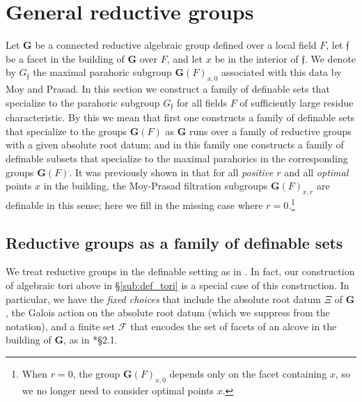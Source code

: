 \documentclass{amsart}
\newcommand{\cF}{\mathcal{F}}
\newcommand{\bG}{\mathbf{G}}
\newcommand{\ff}{{\mathfrak f}}
\theoremstyle{plain}
\theoremstyle{definition}
\begin{document}
\section{General reductive groups}\label{sec:groups}
Let $\bG$ be a connected reductive algebraic group defined over a local field $F$,
let $\ff$ be a facet in the building of $\bG$ over $F$, and let $x$ be in the interior of $\ff$. 
We denote by $G_\ff$ the maximal parahoric subgroup $\bG(F)_{x, 0}$ associated with this data
by Moy and Prasad.
In this section we construct a family of definable sets that specialize to the parahoric subgroup ${G}_{\ff}$
for all fields $F$ of sufficiently large residue characteristic. By this we mean that first one constructs a family of definable sets that specialize to the groups $\bG(F)$ as $\bG$ runs over a family of reductive groups with a given absolute root datum; and in this family one constructs a family of definable subsets that specialize to the maximal parahorics in the corresponding groups $\bG(F)$.
It was previously shown in \cite{cluckers-gordon-halupczok:14b} that for all \emph{positive} $r$ and all \emph{optimal} points $x$ in the building,
the Moy-Prasad filtration subgroups ${\bG}(F)_{x, r}$ are definable in this sense; here we fill in the missing case where
$r=0$.\footnote{When $r=0$, the group ${\bG}(F)_{x,0}$ depends only on the facet containing $x$,
so we no longer need to consider optimal points $x$.}

\subsection{Reductive groups as a family of definable sets}
We treat reductive groups in the definable setting as in \cite{gordon-hales:15a}.
In fact, our construction of algebraic tori above in \S \ref{sub:def_tori} is a special case of this construction.
In particular, we have the \emph{fixed choices} that include the absolute root datum $\Xi$ of $\bG$, the Galois action on the absolute root datum (which we suppress from the notation), and a finite set $\cF$ that encodes
the set of facets of an alcove in the building of $\bG$, as in \cite{gordon-hales:15a}*{\S 2.1}.
\end{document}
